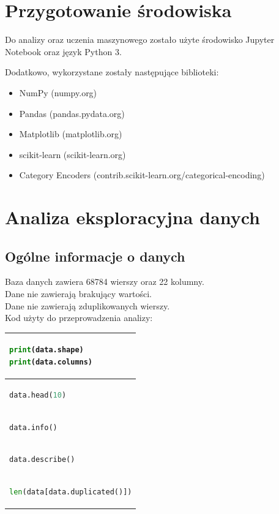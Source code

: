 \documentclass[11pt, a4paper]{article}
\begin{document}
\section{Przygotowanie środowiska}
    Do analizy oraz uczenia maszynowego zostało użyte środowisko Jupyter Notebook oraz język Python 3.
    
    Dodatkowo, wykorzystane zostały następujące biblioteki:
    \begin{itemize}
        \item NumPy (numpy.org)
        \item Pandas (pandas.pydata.org)
        \item Matplotlib (matplotlib.org)
        \item scikit-learn (scikit-learn.org)
        \item Category Encoders (contrib.scikit-learn.org/categorical-encoding)
    \end{itemize}

\newpage
\section{Analiza eksploracyjna danych}
    
\subsection{Ogólne informacje o danych}

    Baza danych zawiera 68784 wierszy oraz 22 kolumny.\\
    Dane nie zawierają brakujący wartości.\\
    Dane nie zawierają zduplikowanych wierszy.\\
    
    Kod użyty do przeprowadzenia analizy:\\
    
        \begin{tabular}{|l|}
            \hline
            \begin{lstlisting}[language=Python]
print(data.shape)
print(data.columns)
            \end{lstlisting}
            \\ \hline
            \begin{lstlisting}[language=Python]
data.head(10)
            \end{lstlisting}
            \\ \hline
            \begin{lstlisting}[language=Python]
data.info()
            \end{lstlisting}
            \\ \hline
            \begin{lstlisting}[language=Python]
data.describe()
            \end{lstlisting}
            \\ \hline
            \begin{lstlisting}[language=Python]
len(data[data.duplicated()])
            \end{lstlisting}
            \\ \hline
        \end{tabular}
    
\end{document}
